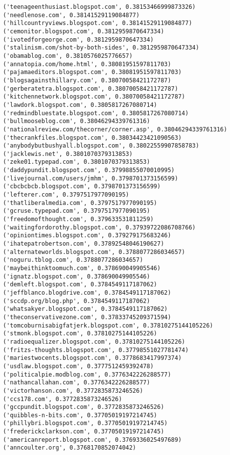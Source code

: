 \documentclass[11pt]{article}
\begin{document}
\begin{Verbatim}[commandchars=\\\{\}]
('teenageenthusiast.blogspot.com', 0.38153466999873326)
('needlenose.com', 0.38141529119084877)
('hillcountryviews.blogspot.com', 0.38141529119084877)
('cemonitor.blogspot.com', 0.3812959870647334)
('ivotedforgeorge.com', 0.3812959870647334)
('stalinism.com/shot-by-both-sides', 0.3812959870647334)
('obamablog.com', 0.3810576025776657)
('annatopia.com/home.html', 0.38081951597811703)
('pajamaeditors.blogspot.com', 0.38081951597811703)
('blogsagainsthillary.com', 0.38070058421172787)
('gerberatetra.blogspot.com', 0.38070058421172787)
('kitchennetwork.blogspot.com', 0.38070058421172787)
('lawdork.blogspot.com', 0.3805817267080714)
('redmindbluestate.blogspot.com', 0.3805817267080714)
('bullmooseblog.com', 0.38046294339761316)
('nationalreview.com/thecorner/corner.asp', 0.38046294339761316)
('thecrankfiles.blogspot.com', 0.38034423421090563)
('anybodybutbushyall.blogspot.com', 0.38022559907858783)
('jacklewis.net', 0.3801070379313853)
('zeke01.typepad.com', 0.3801070379313853)
('daddypundit.blogspot.com', 0.37998855070010995)
('livejournal.com/users/jmhm', 0.3798701373156599)
('cbcbcbcb.blogspot.com', 0.3798701373156599)
('lefterer.com', 0.3797517977090195)
('thatliberalmedia.com', 0.3797517977090195)
('gcruse.typepad.com', 0.3797517977090195)
('freedomofthought.com', 0.379633531811259)
('waitingfordorothy.blogspot.com', 0.37939722086708766)
('opiniontimes.blogspot.com', 0.379279175683246)
('ihatepatrobertson.com', 0.37892548046190627)
('alternateworlds.blogspot.com', 0.3788077286034657)
('noguru.tblog.com', 0.3788077286034657)
('maybeithinktoomuch.com', 0.378690049905546)
('ignatz.blogspot.com', 0.378690049905546)
('demleft.blogspot.com', 0.3784549117187062)
('jeffblanco.blogdrive.com', 0.3784549117187062)
('sccdp.org/blog.php', 0.3784549117187062)
('whatsakyer.blogspot.com', 0.3784549117187062)
('theconservativezone.com', 0.37833745209371594)
('tomcoburnisabigfatjerk.blogspot.com', 0.37810275144105226)
('stmonk.blogspot.com', 0.37810275144105226)
('radioequalizer.blogspot.com', 0.37810275144105226)
('fritzs-thoughts.blogspot.com', 0.37798551027781474)
('mariestwocents.blogspot.com', 0.3778683417997374)
('usdlaw.blogspot.com', 0.3777512459392478)
('politicalpie.modblog.com', 0.3776342226288577)
('nathancallahan.com', 0.3776342226288577)
('victorhanson.com', 0.3772835873246526)
('ccs178.com', 0.3772835873246526)
('gccpundit.blogspot.com', 0.3772835873246526)
('quibbles-n-bits.com', 0.37705019197214745)
('phillybri.blogspot.com', 0.37705019197214745)
('frederickclarkson.com', 0.37705019197214745)
('americanreport.blogspot.com', 0.3769336025497689)
('anncoulter.org', 0.3768170852074042)

\end{Verbatim}
\end{document}
